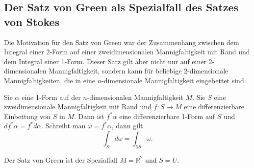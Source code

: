 %
%
\subsection{Der Satz von Green als Spezialfall des Satzes von Stokes}
Die Motivation für den Satz von Green war der Zusammenhang zwischen
dem Integral einer 2-Form auf einer zweidimensionalen Mannigfaltigkeit
mit Rand und dem Integral einer 1-Form.
Dieser Satz gilt aber nicht nur auf einer 2-dimensionalen Mannigfaltigkeit,
sondern kann für beliebige 2-dimensionale Mannigfaltigkeiten, die in
eine $n$-dimensionale Mannigfaltigkeit eingebettet sind.

\begin{satz}[Stokes]
Sie $\alpha$ eine 1-Form auf der $n$-dimensionalen Mannigfaltigkeit $M$.
Sie $S$ eine zweidimensionale Mannigfaltigkeit mit Rand und
$f\colon S\to M$ eine differenzierbare Einbettung von $S$ in $M$.
Dann ist $f^*\alpha$ eine differenzierbare 1-Form auf $S$ und
$df^*\alpha=f^*d\alpha$.
Schreibt man $\omega=f^*\alpha$,
dann gilt
\[
\int_S d\omega
=
\int_{\partial S}\omega.
\]
\end{satz}

Der Satz von Green ist der Spezialfall $M=\mathbb{R}^2$ und $S=U$.

